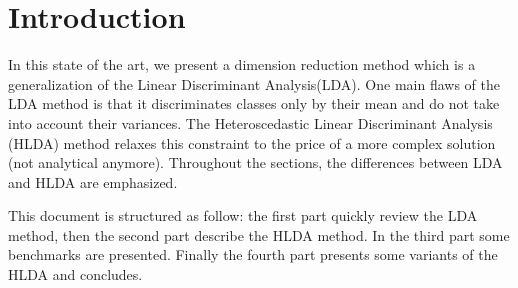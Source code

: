 
\section{Introduction}
\label{sec:introduction}

In this state of the art, we present a dimension reduction method
which is a generalization of the Linear Discriminant Analysis(LDA).
One main flaws of the LDA method
is that it discriminates classes only by their mean and do not take into
account their variances. The Heteroscedastic Linear Discriminant Analysis (HLDA)
method relaxes this constraint to the price of a more complex solution
(not analytical anymore). Throughout the sections, the differences between LDA and
HLDA are emphasized.

This document is structured as follow: the first part quickly review the LDA method,
then the second part describe the HLDA method. In the third part some benchmarks
are presented. Finally the fourth part presents some variants of the HLDA and concludes.
